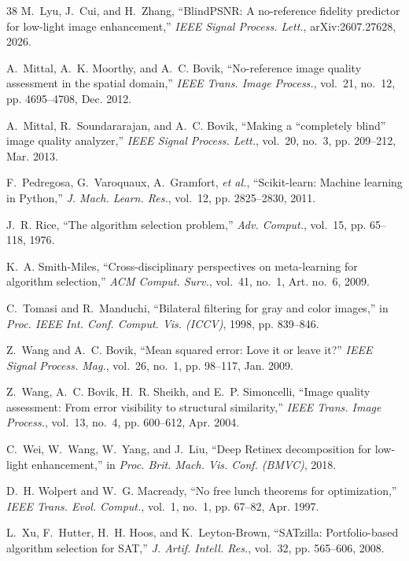 \documentclass[journal]{IEEEtran}
\begin{document}
\begin{thebibliography}{38}
M.~Lyu, J.~Cui, and H.~Zhang, ``BlindPSNR: A no-reference fidelity predictor for low-light image enhancement,'' \emph{IEEE Signal Process. Lett.}, arXiv:2607.27628, 2026.

A.~Mittal, A.~K. Moorthy, and A.~C. Bovik, ``No-reference image quality assessment in the spatial domain,'' \emph{IEEE Trans. Image Process.}, vol.~21, no.~12, pp. 4695--4708, Dec. 2012.

A.~Mittal, R.~Soundararajan, and A.~C. Bovik, ``Making a ``completely blind'' image quality analyzer,'' \emph{IEEE Signal Process. Lett.}, vol.~20, no.~3, pp. 209--212, Mar. 2013.

F.~Pedregosa, G.~Varoquaux, A.~Gramfort, \emph{et al.}, ``Scikit-learn: Machine learning in Python,'' \emph{J. Mach. Learn. Res.}, vol.~12, pp. 2825--2830, 2011.

J.~R. Rice, ``The algorithm selection problem,'' \emph{Adv. Comput.}, vol.~15, pp. 65--118, 1976.

K.~A. Smith-Miles, ``Cross-disciplinary perspectives on meta-learning for algorithm selection,'' \emph{ACM Comput. Surv.}, vol.~41, no.~1, Art. no.~6, 2009.

C.~Tomasi and R.~Manduchi, ``Bilateral filtering for gray and color images,'' in \emph{Proc. IEEE Int. Conf. Comput. Vis. (ICCV)}, 1998, pp. 839--846.

Z.~Wang and A.~C. Bovik, ``Mean squared error: Love it or leave it?'' \emph{IEEE Signal Process. Mag.}, vol.~26, no.~1, pp. 98--117, Jan. 2009.

Z.~Wang, A.~C. Bovik, H.~R. Sheikh, and E.~P. Simoncelli, ``Image quality assessment: From error visibility to structural similarity,'' \emph{IEEE Trans. Image Process.}, vol.~13, no.~4, pp. 600--612, Apr. 2004.

C.~Wei, W.~Wang, W.~Yang, and J.~Liu, ``Deep Retinex decomposition for low-light enhancement,'' in \emph{Proc. Brit. Mach. Vis. Conf. (BMVC)}, 2018.

D.~H. Wolpert and W.~G. Macready, ``No free lunch theorems for optimization,'' \emph{IEEE Trans. Evol. Comput.}, vol.~1, no.~1, pp. 67--82, Apr. 1997.

L.~Xu, F.~Hutter, H.~H. Hoos, and K.~Leyton-Brown, ``SATzilla: Portfolio-based algorithm selection for SAT,'' \emph{J. Artif. Intell. Res.}, vol.~32, pp. 565--606, 2008.


\end{thebibliography}
\end{document}
